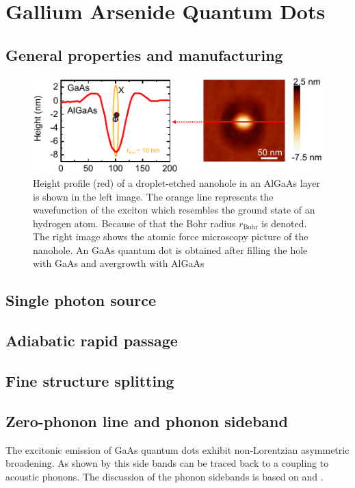 \chapter{Gallium Arsenide Quantum Dots}
\label{chapter:quantum-dot}

\section{General properties and manufacturing}

\begin{figure}[H]
	\centering
	\includegraphics[width=0.9\linewidth]{figures/quantum-dot/QD_plot_AFM}
	\caption[Height profile and AFM picture of a droplet-etched nanohole in an AlGaAs layer]{Height profile (red) of a droplet-etched nanohole in an AlGaAs layer is shown in the left image.
	The orange line represents the wavefunction of the exciton which resembles the ground state of an hydrogen atom.
	Because of that the Bohr radius $r_{\textrm{Bohr}}$ is denoted.
	The right image shows the atomic force microscopy picture of the nanohole.
	An GaAs quantum dot is obtained after filling the hole with GaAs and avergrowth with AlGaAs~\cite{reindl_highly_2019}}
	\label{fig:qdplotafm}
\end{figure}

\section{Single photon source}

\section{Adiabatic rapid passage}

\section{Fine structure splitting}

\section{Zero-phonon line and phonon sideband}
The excitonic emission of GaAs quantum dots exhibit non-Lorentzian asymmetric broadening. As shown by \textcite{peter_phonon_2004} this side bands can be traced back to a coupling to acoustic phonons.
The discussion of the phonon sidebands is based on \textcite{friedrich_photochemical_1984} and \textcite{peter_phonon_2004}.

